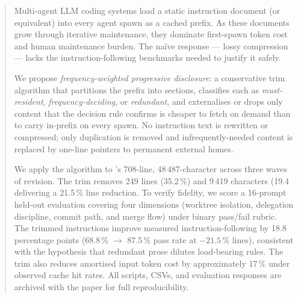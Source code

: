 \begin{abstract}
\noindent
Multi-agent LLM coding systems load a static instruction document
(\claudemd or equivalent) into every agent spawn as a cached prefix.
As these documents grow through iterative maintenance, they dominate
first-spawn token cost and human maintenance burden. The na\"{i}ve
response --- lossy compression --- lacks the instruction-following
benchmarks needed to justify it safely.

We propose \emph{frequency-weighted progressive disclosure}: a
conservative trim algorithm that partitions the prefix into sections,
classifies each as \emph{must-resident}, \emph{frequency-deciding}, or
\emph{redundant}, and externalises or drops only content that the
decision rule confirms is cheaper to fetch on demand than to carry
in-prefix on every spawn. No instruction text is rewritten or
compressed; only duplication is removed and infrequently-needed
content is replaced by one-line pointers to permanent external homes.

We apply the algorithm to \blackrim's 708-line, 48\,487-character
\claudemd across three waves of revision. The trim removes 249 lines
(35.2\,\%) and 9\,419 characters (19.4\,%
delivering a 21.5\,\% line reduction. To verify fidelity, we score a
16-prompt held-out evaluation covering four dimensions (worktree
isolation, delegation discipline, commit path, and merge flow) under
binary pass/fail rubric. The trimmed instructions improve measured
instruction-following by 18.8 percentage points (68.8\,\%
$\to$ 87.5\,\% pass rate at $-21.5$\,\% lines), consistent with the
hypothesis that redundant prose dilutes load-bearing rules. The trim
also reduces amortised input token cost by approximately 17\,\% under
observed cache hit rates. All scripts, CSVs, and evaluation responses
are archived with the paper for full reproducibility.
\end{abstract}
